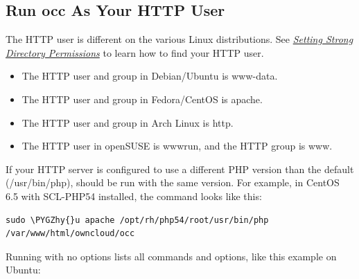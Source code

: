 \documentclass[letterpaper,10pt,english]{sphinxmanual}
\def\PYGZhy{\char`\-}
\begin{document}
\subsection{Run occ As Your HTTP User}
\label{configuration_server/occ_command:run-occ-as-your-http-user}\label{configuration_server/occ_command:http-user-label}
The HTTP user is different on the various Linux distributions. See
{\hyperref[installation/installation_wizard:strong-perms-label]{\emph{Setting Strong Directory Permissions}}} to learn how to find your HTTP user.
\begin{itemize}
\item {} 
The HTTP user and group in Debian/Ubuntu is www-data.

\item {} 
The HTTP user and group in Fedora/CentOS is apache.

\item {} 
The HTTP user and group in Arch Linux is http.

\item {} 
The HTTP user in openSUSE is wwwrun, and the HTTP group is www.

\end{itemize}

If your HTTP server is configured to use a different PHP version than the
default (/usr/bin/php),  should be run with the same version. For
example, in CentOS 6.5 with SCL-PHP54 installed, the command looks like this:

\begin{Verbatim}[commandchars=\\\{\}]
sudo \PYGZhy{}u apache /opt/rh/php54/root/usr/bin/php /var/www/html/owncloud/occ
\end{Verbatim}

Running  with no options lists all commands and options, like this
example on Ubuntu:
\end{document}
